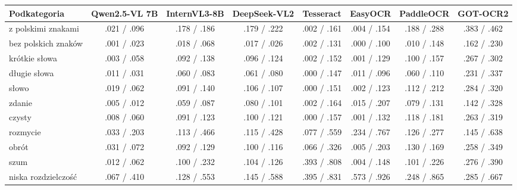\begin{tabular}{lccccccc}
\toprule
Podkategoria & Qwen2.5-VL 7B & InternVL3-8B & DeepSeek-VL2 & Tesseract & EasyOCR & PaddleOCR & GOT-OCR2 \\
\midrule
z polskimi znakami & .021 / .096 & .178 / .186 & .179 / .222 & .002 / .161 & .004 / .154 & .188 / .288 & .383 / .462 \\
bez polskich znaków & .001 / .023 & .018 / .068 & .017 / .026 & .002 / .131 & .000 / .100 & .010 / .148 & .162 / .230 \\
\midrule
krótkie słowa & .003 / .058 & .092 / .138 & .096 / .124 & .002 / .152 & .001 / .129 & .100 / .157 & .267 / .302 \\
długie słowa & .011 / .031 & .060 / .083 & .061 / .080 & .000 / .147 & .011 / .096 & .060 / .110 & .231 / .337 \\
\midrule
słowo & .019 / .062 & .091 / .140 & .106 / .107 & .000 / .151 & .002 / .123 & .112 / .212 & .284 / .320 \\
zdanie & .005 / .012 & .059 / .087 & .080 / .101 & .002 / .164 & .015 / .207 & .079 / .131 & .142 / .328 \\
\midrule
czysty & .008 / .060 & .091 / .123 & .100 / .121 & .000 / .157 & .001 / .132 & .118 / .181 & .263 / .319 \\
rozmycie & .033 / .203 & .113 / .466 & .115 / .428 & .077 / .559 & .234 / .767 & .126 / .277 & .145 / .638 \\
obrót & .031 / .072 & .092 / .129 & .100 / .116 & .066 / .326 & .005 / .203 & .130 / .169 & .258 / .349 \\
szum & .012 / .062 & .100 / .232 & .104 / .126 & .393 / .808 & .004 / .148 & .101 / .226 & .276 / .390 \\
niska rozdzielczość & .067 / .410 & .128 / .553 & .145 / .588 & .395 / .831 & .573 / .926 & .248 / .865 & .285 / .667 \\
\bottomrule
\end{tabular}
